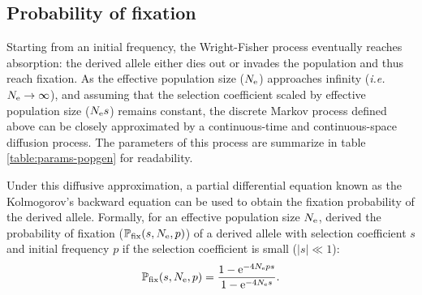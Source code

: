 \subsection{Probability of fixation}

Starting from an initial frequency, the Wright-Fisher process eventually reaches absorption: the derived allele either dies out or invades the population and thus reach fixation.
As the effective population size ($N_{\textrm{e}}$) approaches infinity (\textit{i.e.} $ N_{\textrm{e}} \to \infty$), and assuming that the selection coefficient scaled by effective population size ($N_{\textrm{e}} s $) remains constant, the discrete Markov process defined above can be closely approximated by a continuous-time and continuous-space diffusion process.
The parameters of this process are summarize in table \ref{table:params-popgen} for readability.

\begin{table}[H]
	\centering
	\noindent{}
	\caption[Parameters of population genetics]{Parameters of population genetics}\label{table:params-popgen}
\end{table}

Under this diffusive approximation, a partial differential equation known as the Kolmogorov's backward equation can be used to obtain the fixation probability of the derived allele.
Formally, for an effective population size $N_{\textrm{e}}$, \citet{Kimura1962} derived the probability of fixation ($\mathbb{P}_{\mathrm{fix}}(s, N_{\textrm{e}}, p)$) of a derived allele with selection coefficient $s$ and initial frequency $p$ if the selection coefficient is small ($|s| \ll 1$):
\begin{equation}
    \mathbb{P}_{\mathrm{fix}}(s, N_{\textrm{e}}, p) = \dfrac{1 - \mathrm{e}^{-4 N_{\textrm{e}} p s }}{1 - \mathrm{e}^{-4 N_{\textrm{e}} s}}.
\end{equation}

